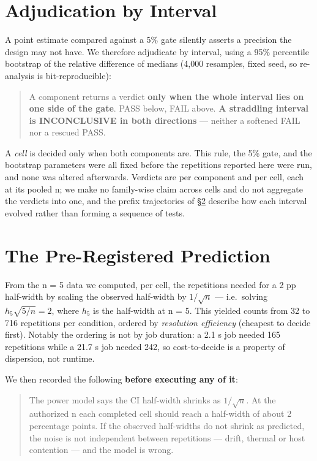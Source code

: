 \documentclass[sigconf,review,anonymous]{acmart}
\begin{document}
\section{Adjudication by Interval}\label{sec:adjudication}

A point estimate compared against a 5\% gate silently asserts a precision the design may not
have. We therefore adjudicate by interval, using a 95\% percentile bootstrap of the relative
difference of medians (4,000 resamples, fixed seed, so re-analysis is bit-reproducible):

\begin{quote}
A component returns a verdict \textbf{only when the whole interval lies on one side of the gate}.
PASS below, FAIL above. \textbf{A straddling interval is INCONCLUSIVE in both directions} --- neither
a softened FAIL nor a rescued PASS.
\end{quote}

A \emph{cell} is decided only when both components are. This rule, the 5\% gate, and the bootstrap
parameters were all fixed before the repetitions reported here were run, and none was altered
afterwards. Verdicts are per component and per cell, each at its pooled n; we make no family-wise
claim across cells and do not aggregate the verdicts into one, and the prefix trajectories of
\S\ref{sec:prediction} describe how each interval evolved rather than forming a sequence of tests.

\section{The Pre-Registered Prediction}\label{sec:prediction}

From the n = 5 data we computed, per cell, the repetitions needed for a 2 pp half-width by
scaling the observed half-width by $1/\sqrt{n}$ --- i.e.\ solving $h_5\sqrt{5/n} = 2$, where $h_5$ is
the half-width at n = 5. This yielded counts from 32 to 716 repetitions per condition, ordered by
\emph{resolution efficiency} (cheapest to decide first). Notably the ordering is not by job duration:
a 2.1 s job needed 165 repetitions while a 21.7 s job needed 242, so cost-to-decide is a property
of dispersion, not runtime.

We then recorded the following \textbf{before executing any of it}:

\begin{quote}
The power model says the CI half-width shrinks as $1/\sqrt{n}$. At the authorized n each completed
cell should reach a half-width of about 2 percentage points. If the observed half-widths do
not shrink as predicted, the noise is not independent between repetitions --- drift, thermal or
host contention --- and the model is wrong.
\end{quote}
\end{document}
